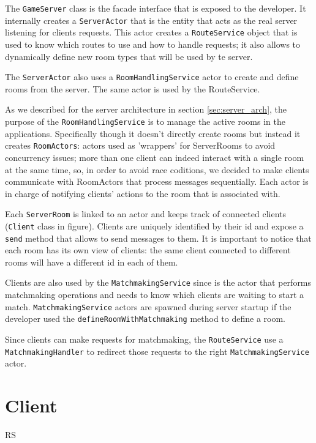 The \texttt{GameServer} class is the facade interface that is exposed to the developer. It internally creates a \texttt{ServerActor} that is the entity that acts as the real server listening for clients requests. This actor creates a \texttt{RouteService} object that is used to know which routes to use and how to handle requests; it also allows to dynamically define new room types that will be used by te server. 

The \texttt{ServerActor} also uses a \texttt{RoomHandlingService} actor to create and define rooms from the server. The same actor is used by the RouteService.

As we described for the server architecture in section \ref{sec:server_arch}, the purpose of the \texttt{RoomHandlingService} is to manage the active rooms in the applications. Specifically though it doesn't directly create rooms but instead it creates \texttt{RoomActors}: actors used as 'wrappers' for ServerRooms to avoid concurrency issues; more than one client can indeed interact with a single room at the same time, so, in order to avoid race coditions, we decided to make clients communicate with RoomActors that process messages sequentially. Each actor is in charge of notifying clients' actions to the room that is associated with.

Each \texttt{ServerRoom} is linked to an actor and keeps track of connected clients (\texttt{Client} class in figure). Clients are uniquely identified by their id and expose a \texttt{send} method that allows to send messages to them. It is important to notice that each room has its own view of clients: the same client connected to different rooms will have a different id in each of them. 

Clients are also used by the \texttt{MatchmakingService} since is the actor that performs matchmaking operations and needs to know which clients are waiting to start a match. \texttt{MatchmakingService} actors are spawned during server startup if the developer used the \texttt{defineRoomWithMatchmaking} method to define a room. 

Since clients can make requests for matchmaking, the \texttt{RouteService} use a \texttt{MatchmakingHandler} to redirect those requests to the right \texttt{MatchmakingService} actor.


\section{Client}

RS

